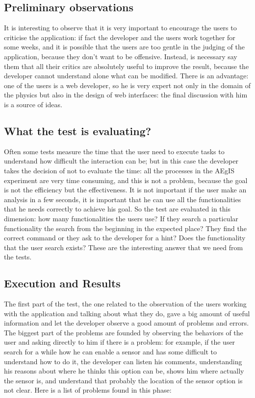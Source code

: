 \subsection{Preliminary observations}
It is interesting to observe that it is very important to encourage the users to criticise the application: if fact the developer and the users work together for some weeks, and it is possible that the users are too gentle in the judging of the application, because they don't want to be offensive. Instead, is necessary say them that all their critics are absolutely useful to improve the result, because the developer cannot understand alone what can be modified. 
There is an advantage: one of the users is a web developer, so he is very expert not only in the domain of the physics but also in the design of web interfaces: the final discussion with him is a source of ideas.  

\subsection{What the test is evaluating?}
Often some tests measure the time that the user need to execute tasks to understand how difficult the interaction can be; but in this case the developer takes the decision of not to evaluate the time: all the processes in the AEgIS experiment are very time consuming, and this is not a problem, because the goal is not the efficiency but the effectiveness. It is not important if the user make an analysis in a few seconds, it is important that he can use all the functionalities that he needs correctly to achieve his goal. So the test are evaluated in this dimension: how many functionalities the users use? If they search a particular functionality the search from the beginning in the expected place? They find the correct command or they ask to the developer for a hint? Does the functionality that the user search exists? These are the interesting answer that we need from the tests.  

\subsection{Execution and Results}
The first part of the test, the one related to the observation of the users working with the application and talking about what they do, gave a big amount of useful information and let the developer observe a good amount of problems and errors. 
The biggest part of the problems are founded by observing the behaviors of the user and asking directly to him if there is a problem: for example, if the user search for a while how he can enable a sensor and has some difficult to understand how to do it, the developer can listen his comments, understanding his reasons about where he thinks this option can be, shows him where actually the sensor is, and understand that probably the location of the sensor option is not clear. 
Here is a list of problems found in this phase:

